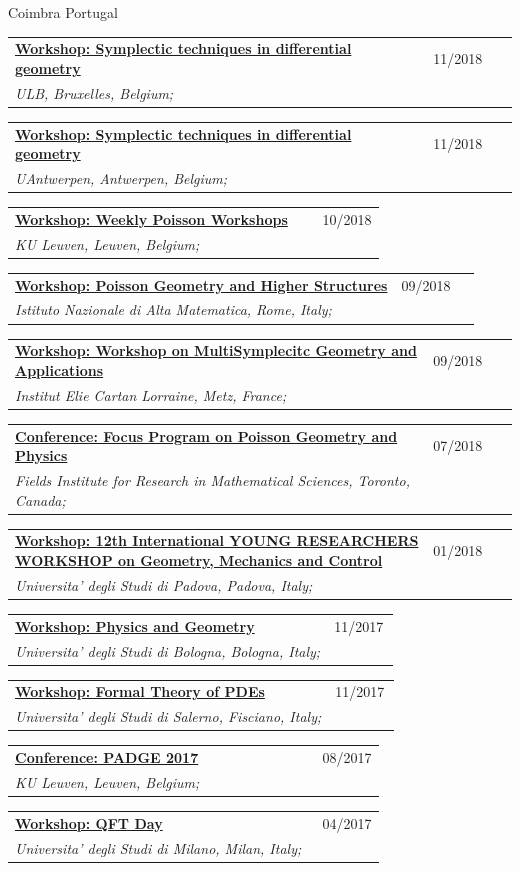 \documentclass[a4paper]{article}
\newcommand{\longvoice}[8]{
    \begin{tabular}{p{0.83\linewidth} p{0.17\linewidth} }
        \textbf{\href{#3}{#2: #1}} & #4 
        \\ 
        \textit{#5, #6, #7;} & {\small\emph{#8}}
    \end{tabular}
    \vspace{.5em}
}
\begin{document}
        {Coimbra}
        {Portugal}
        {}
    \longvoice{Symplectic techniques in differential geometry}
        {Workshop}
        {https://www.uantwerpen.be/nl/personeel/sonja-hohloch/private-webpage/excellence-of-scienc/minicourses/}
        {11/2018}
        {ULB}
        {Bruxelles}
        {Belgium}
        {}
    \longvoice{Symplectic techniques in differential geometry}
        {Workshop}
        {https://www.uantwerpen.be/nl/personeel/sonja-hohloch/private-webpage/excellence-of-scienc/minicourses/}
        {11/2018}
        {UAntwerpen}
        {Antwerpen}
        {Belgium}
        {}
    \longvoice{Weekly Poisson Workshops}
        {Workshop}
        {https://wis.kuleuven.be/meetkunde/PoissonWorkingGroup}
        {10/2018}
        {KU Leuven}
        {Leuven}
        {Belgium}
        {}
    \longvoice{Poisson Geometry and Higher Structures}
        {Workshop}
        {https://web.archive.org/web/20190831103317/http://www1.mat.uniroma1.it/ricerca/convegni/2018/hippo2018/index.html}
        {09/2018}
        {Istituto Nazionale di Alta Matematica}
        {Rome}
        {Italy}
        {}
    \longvoice{Workshop on MultiSymplecitc Geometry and Applications}
        {Workshop}
        {https://web.archive.org/web/20180704152639/http://www.math.univ-metz.fr/~wurzbacher/GEMSA.html}
        {09/2018}
        {Institut Elie Cartan Lorraine}
        {Metz}
        {France}
        {}
    \longvoice{Focus Program on Poisson Geometry and Physics}
        {Conference}
        {https://web.archive.org/web/20190831105328/http://www.fields.utoronto.ca/activities/18-19/poisson-2018}
        {07/2018}
        {Fields Institute for Research in Mathematical Sciences}
        {Toronto}
        {Canada}
        {}
    \longvoice{12th International YOUNG RESEARCHERS WORKSHOP on Geometry, Mechanics and Control}
        {Workshop}
        {http://events.math.unipd.it/12YRW/}
        {01/2018}
        {Universita' degli Studi di Padova}
        {Padova}
        {Italy}
        {}
    \longvoice{Physics and Geometry}
        {Workshop}
        {https://agenda.infn.it/conferenceDisplay.py?confId=14261}
        {11/2017}
        {Universita' degli Studi di Bologna}
        {Bologna}
        {Italy}
        {}
    \longvoice{Formal Theory of PDEs}
        {Workshop}
        {http://www.dipmat2.unisa.it/people/vitagliano/www/micro-workshop.html}
        {11/2017}
        {Universita' degli Studi di Salerno}
        {Fisciano}
        {Italy}
        {}
    \longvoice{PADGE 2017}
        {Conference}
        {https://web.archive.org/web/20170924130155/https://wis.kuleuven.be/events/padge2017}
        {08/2017}
        {KU Leuven}
        {Leuven}
        {Belgium}
        {}
    \longvoice{QFT Day}
        {Workshop}
        {https://web.archive.org/web/20170924130005/http://www.matematica.unimi.it/extfiles/unimidire/66001/attachment/qft-day-2017-1.pdf}
        {04/2017}
        {Universita' degli Studi di Milano}
        {Milan}
        {Italy}
        {}
\end{document}
